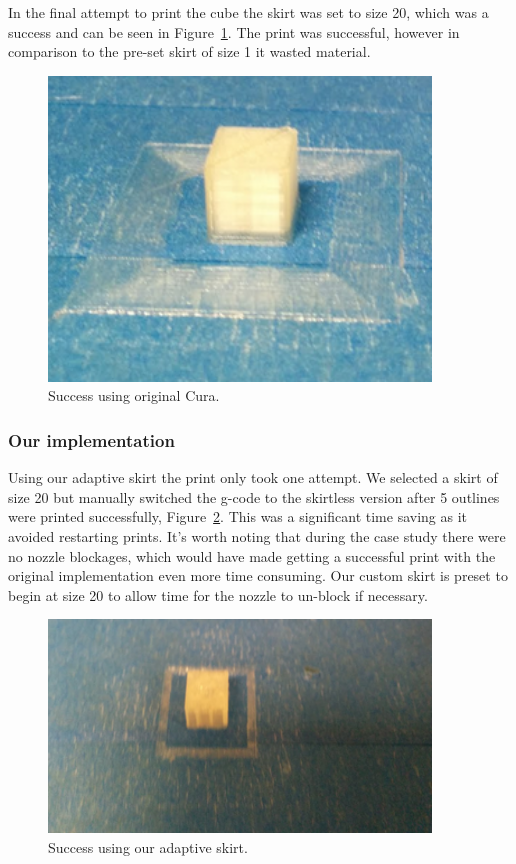 \documentclass[pdftex, 11pt]{report} %
\begin{document}
In the final attempt to print the cube the skirt was set to size 20, which was a success and can be seen in Figure~\ref{figure:SkirtOld2}. The print was successful, however in comparison to the pre-set skirt of size 1 it wasted material. 

\begin{figure}[H]
  \centering
  \includegraphics[width=4in]{SkirtOld2.png}
  \caption{Success using original Cura.}
  \label{figure:SkirtOld2}
\end{figure}

\subsubsection{Our implementation}
Using our adaptive skirt the print only took one attempt. We selected a skirt of size 20 but manually switched the g-code to the skirtless version after 5 outlines were printed successfully, Figure~\ref{figure:SkirtNew1}. This was a significant time saving as it avoided restarting prints. It's worth noting that during the case study there were no nozzle blockages, which would have made getting a successful print with the original implementation even more time consuming. Our custom skirt is preset to begin at size 20 to allow time for the nozzle to un-block if necessary.


\begin{figure}[H]
  \centering
  \includegraphics[width=4in]{SkirtNew1.png}
  \caption{Success using our adaptive skirt.}
  \label{figure:SkirtNew1}
\end{figure}
\end{document}

